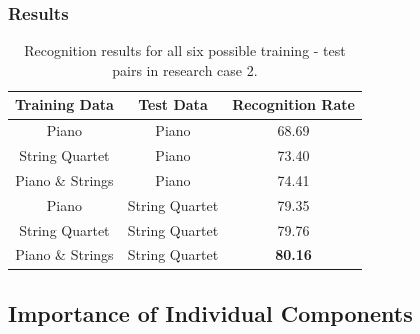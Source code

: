\documentclass{beamer}
\begin{document}
\begin{frame}
	\frametitle{Results}
	
	\begin{table}\small
\centering
\begin{tabular}{|c|c|c|} \hline
\textbf{Training Data} & \textbf{Test Data} & \textbf{Recognition Rate} \\ \hline
Piano & Piano & 68.69 \\ \hline
String Quartet & Piano & 73.40 \\ \hline
Piano \& Strings & Piano & 74.41 \\ \hline
Piano & String Quartet & 79.35 \\ \hline
String Quartet & String Quartet & 79.76 \\ \hline
Piano \& Strings & String Quartet & \textbf{80.16} \\ \hline
\end{tabular}
\caption{Recognition results for all six possible training - test pairs in research case 2.}
\label{tab:tab5}
\end{table}
\end{frame} 



\subsection[Importance of Individual Components]{Importance of Individual Components}
\end{document}
